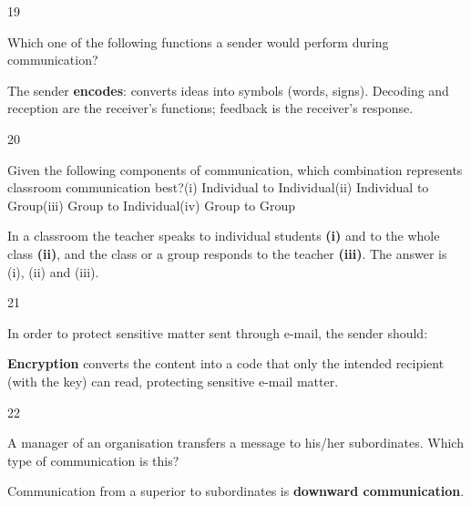 \begin{question}{19}
{Which one of the following functions a sender would perform during communication?\par}
\begin{explain}
The sender \textbf{encodes}: converts ideas into symbols (words, signs). Decoding and reception are the receiver's functions; feedback is the receiver's response.
\end{explain}
\end{question}

\begin{question}{20}
{Given the following components of communication, which combination represents classroom communication best?\newline (i) Individual to Individual\newline (ii) Individual to Group\newline (iii) Group to Individual\newline (iv) Group to Group\par}
\begin{explain}
In a classroom the teacher speaks to individual students \textbf{(i)} and to the whole class \textbf{(ii)}, and the class or a group responds to the teacher \textbf{(iii)}. The answer is (i), (ii) and (iii).
\end{explain}
\end{question}

\begin{question}{21}
{In order to protect sensitive matter sent through e-mail, the sender should:\par}
\begin{explain}
\textbf{Encryption} converts the content into a code that only the intended recipient (with the key) can read, protecting sensitive e-mail matter.
\end{explain}
\end{question}

\begin{question}{22}
{A manager of an organisation transfers a message to his/her subordinates. Which type of communication is this?\par}
\begin{explain}
Communication from a superior to subordinates is \textbf{downward communication}.
\end{explain}
\end{question}

